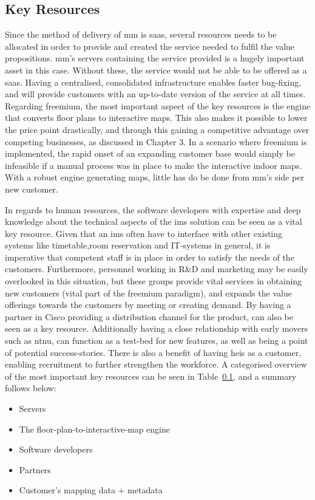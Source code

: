 \subsection{Key Resources}
Since the method of delivery of \gls{mm} is \gls{saas}, several resources needs to be allocated in order to provide and created the service needed to fulfil the value propositions. \gls{mm}'s servers containing the service provided is a hugely important asset in this case. Without these, the service would not be able to be offered as a \gls{saas}. Having a centralised, consolidated infrastructure enables faster bug-fixing, and will provide customers with an up-to-date version of the service at all times. Regarding freemium, the most important aspect of the key resources is the engine that converts floor plans to interactive maps. This also makes it possible to lower the price point drastically, and through this gaining a competitive advantage over competing businesses, as discussed in Chapter 3. In a scenario where freemium is implemented, the rapid onset of an expanding customer base would simply be infeasible if a manual process was in place to make the interactive indoor maps. With a robust engine generating maps, little has do be done from \gls{mm}'s side per new customer.


In regards to human resources, the software developers with expertise and deep knowledge about the technical aspects of the \gls{ims} solution can be seen as a vital key resource. Given that an \gls{ims} often have to interface with other existing systems like timetable,room reservation and IT-systems in general, it is imperative that competent staff is in place in order to satisfy the needs of the customers. Furthermore, personnel working in R\&D and marketing may be easily overlooked in this situation, but these groups provide vital services in obtaining new customers (vital part of the freemium paradigm), and expands the value offerings towards the customers by meeting or creating demand. By having a partner in Cisco providing a distribution channel for the product, can also be seen as a key resource. Additionally having a close relationship with early movers such as \gls{ntnu}, can function as a test-bed for new features, as well as being a point of potential success-stories. There is also a benefit of having \glspl{hei} as a customer, enabling recruitment to further strengthen the workforce. A categorised overview of the most important key resources can be seen in Table~\ref{}, and a summary follows below:

\begin{itemize}
    \item Servers
    \item The floor-plan-to-interactive-map engine
    \item Software developers
    \item Partners
    \item Customer's mapping data + metadata
\end{itemize}

